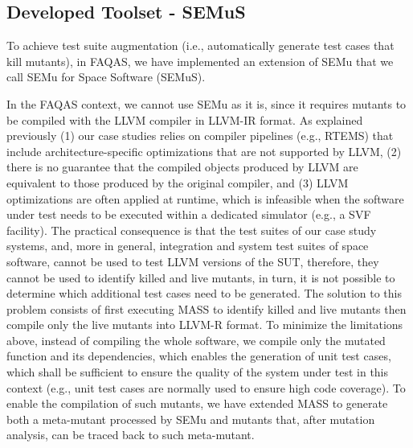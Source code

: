 
\newpage
\subsection{Developed Toolset - SEMuS}
\label{sec:semus}

\STARTCHANGEDWPT


To achieve test suite augmentation (i.e., automatically generate test cases that kill mutants), in FAQAS, we have implemented an extension of SEMu that we call SEMu for Space Software (SEMuS).



In the FAQAS context, we cannot use SEMu as it is, since it requires mutants to be compiled with the LLVM compiler in LLVM-IR format. As explained previously (1) our case studies relies on compiler pipelines (e.g., RTEMS) that include architecture-specific optimizations that are not supported by LLVM, (2) there is no guarantee that the compiled objects produced by LLVM are equivalent to those produced by the original compiler, and (3) LLVM optimizations are often applied at runtime, which is infeasible when the software under test needs to be executed within a dedicated simulator (e.g., a SVF facility). The practical consequence is that the test suites of our case study systems, and, more in general, integration and system test suites of space software, cannot be used to test LLVM versions of the SUT, therefore, they cannot be used to identify killed and live mutants, in turn, it is not possible to determine which additional test cases need to be generated. The solution to this problem consists of first executing MASS to identify killed and live mutants then compile only the live mutants into LLVM-R format. To minimize the limitations above, instead of compiling the whole software, we compile only the mutated function and its dependencies, which enables the generation of unit test cases, which shall be sufficient to ensure the quality of the system under test in this context (e.g., unit test cases are normally used to ensure high code coverage). To enable the compilation of such mutants, we have extended MASS to generate both a meta-mutant processed by SEMu and mutants that, after mutation analysis, can be traced back to such meta-mutant.


